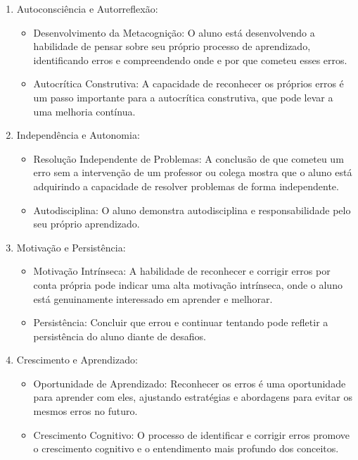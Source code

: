 \begin{enumerate}

    \item Autoconsciência e Autorreflexão:

          \begin{itemize}
              \item Desenvolvimento da Metacognição: O aluno está desenvolvendo a habilidade de pensar sobre seu próprio processo de aprendizado, identificando erros e compreendendo onde e por que cometeu esses erros.
              \item Autocrítica Construtiva: A capacidade de reconhecer os próprios erros é um passo importante para a autocrítica construtiva, que pode levar a uma melhoria contínua.
          \end{itemize}

    \item Independência e Autonomia:

          \begin{itemize}
              \item Resolução Independente de Problemas: A conclusão de que cometeu um erro sem a intervenção de um professor ou colega mostra que o aluno está adquirindo a capacidade de resolver problemas de forma independente.
              \item Autodisciplina: O aluno demonstra autodisciplina e responsabilidade pelo seu próprio aprendizado.
          \end{itemize}

    \item Motivação e Persistência:

          \begin{itemize}
              \item Motivação Intrínseca: A habilidade de reconhecer e corrigir erros por conta própria pode indicar uma alta motivação intrínseca, onde o aluno está genuinamente interessado em aprender e melhorar.
              \item Persistência: Concluir que errou e continuar tentando pode refletir a persistência do aluno diante de desafios.
          \end{itemize}

    \item Crescimento e Aprendizado:

          \begin{itemize}
              \item Oportunidade de Aprendizado: Reconhecer os erros é uma oportunidade para aprender com eles, ajustando estratégias e abordagens para evitar os mesmos erros no futuro.
              \item Crescimento Cognitivo: O processo de identificar e corrigir erros promove o crescimento cognitivo e o entendimento mais profundo dos conceitos.
          \end{itemize}


\end{enumerate}
